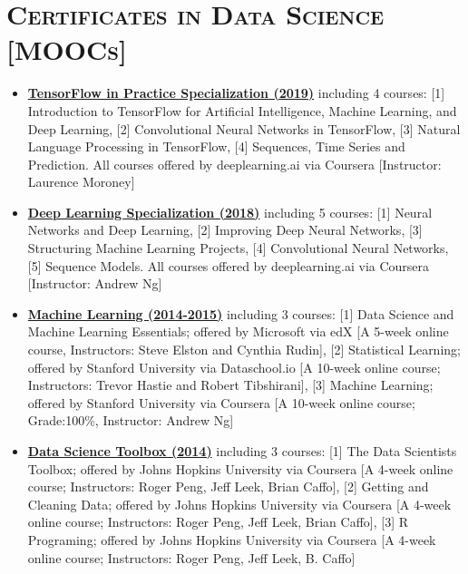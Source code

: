 \documentclass[10pt,a4paper]{moderncv}
\begin{document}
\section{\textsc{Certificates in Data Science [MOOCs]}}

\begin{itemize}
\item \textbf{\href{https://www.coursera.org/specializations/tensorflow-in-practice}{TensorFlow in Practice Specialization (2019)} }including 4 courses: [1] Introduction to TensorFlow for Artificial Intelligence, Machine Learning, and Deep Learning, [2] Convolutional Neural Networks in TensorFlow, [3] Natural Language Processing in TensorFlow, [4] Sequences, Time Series and Prediction. All courses offered by deeplearning.ai via Coursera [Instructor: Laurence Moroney]

\item \textbf{\href{https://www.coursera.org/specializations/deep-learning}{Deep Learning Specialization (2018)}} including 5 courses: [1] Neural Networks and Deep Learning, [2] Improving Deep Neural Networks, [3] Structuring Machine Learning Projects, [4] Convolutional Neural Networks, [5] Sequence Models. All courses offered by deeplearning.ai via Coursera [Instructor: Andrew Ng]

\item \textbf{\href{}{Machine Learning (2014-2015)}} including 3 courses: [1] Data Science and Machine Learning Essentials; offered by Microsoft via edX [A 5-week online course, Instructors: Steve Elston and Cynthia Rudin], [2] Statistical Learning; offered by Stanford University via Dataschool.io [A 10-week online course; Instructors: Trevor Hastie and Robert Tibshirani], [3] Machine Learning; offered by Stanford University via Coursera [A 10-week online course; Grade:100\%, Instructor: Andrew Ng]

\item \textbf{\href{}{Data Science Toolbox (2014)}} including 3 courses: [1] The Data Scientists Toolbox; offered by Johns Hopkins University via Coursera [A 4-week online course; Instructors: Roger Peng, Jeff Leek, Brian Caffo], [2] Getting and Cleaning Data; offered by Johns Hopkins University via Coursera [A 4-week online course; Instructors: Roger Peng, Jeff Leek, Brian Caffo], [3] R Programing; offered by Johns Hopkins University via Coursera [A 4-week online course; Instructors: Roger Peng, Jeff Leek, B. Caffo]

\end{itemize} 
\end{document}
